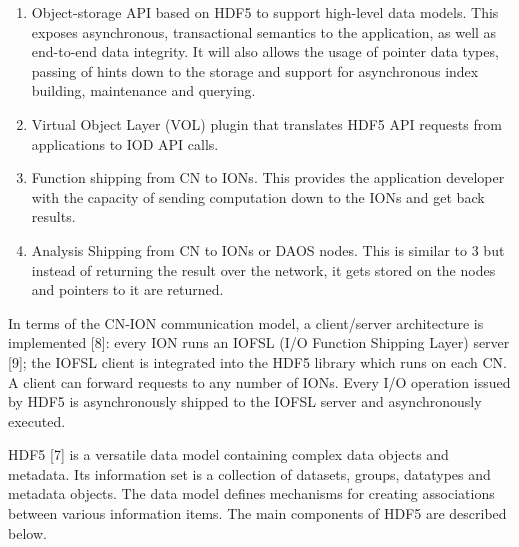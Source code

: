\documentclass[conference]{IEEEtran}
\begin{document}
\begin{enumerate}
\def\labelenumi{\arabic{enumi}.}
\itemsep1pt\parskip0pt
\item
  Object-storage API based on HDF5 to support high-level data models.
  This exposes asynchronous, transactional semantics to the application,
  as well as end-to-end data integrity. It will also allows the usage of
  pointer data types, passing of hints down to the storage and support
  for asynchronous index building, maintenance and querying.
\item
  Virtual Object Layer (VOL) plugin that translates HDF5 API requests
  from applications to IOD API calls.
\item
  Function shipping from CN to IONs. This provides the application
  developer with the capacity of sending computation down to the IONs
  and get back results.
\item
  Analysis Shipping from CN to IONs or DAOS nodes. This is similar to 3
  but instead of returning the result over the network, it gets stored
  on the nodes and pointers to it are returned.
\end{enumerate}

In terms of the CN-ION communication model, a client/server architecture
is implemented {[}8{]}: every ION runs an IOFSL (I/O Function Shipping
Layer) server {[}9{]}; the IOFSL client is integrated into the HDF5
library which runs on each CN. A client can forward requests to any
number of IONs. Every I/O operation issued by HDF5 is asynchronously
shipped to the IOFSL server and asynchronously executed.

HDF5 {[}7{]} is a versatile data model containing complex data objects
and metadata. Its information set is a collection of datasets, groups,
datatypes and metadata objects. The data model defines mechanisms for
creating associations between various information items. The main
components of HDF5 are described below.
\end{document}
